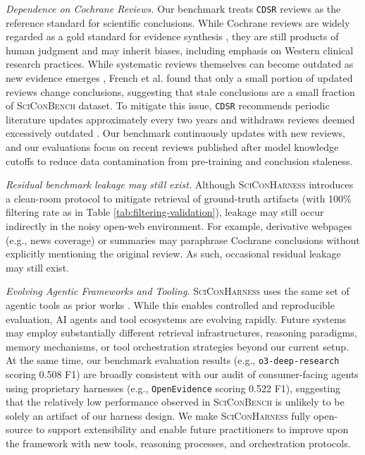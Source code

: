 \documentclass{article}
\begin{document}
\textit{Dependence on Cochrane Reviews.} Our benchmark treats \texttt{CDSR} reviews as the reference standard for scientific conclusions. While Cochrane reviews are widely regarded as a gold standard for evidence synthesis \cite{smith2013cochrane}, they are still products of human judgment and may inherit biases, including emphasis on Western clinical research practices. While systematic reviews themselves can become outdated as new evidence emerges \cite{doi:10.7326/0003-4819-147-4-200708210-00179}, French et al. \cite{french2005investing} found that only a small portion of updated reviews change conclusions, suggesting that stale conclusions are a small fraction of \textsc{SciConBench} dataset. To mitigate this issue, \texttt{CDSR} recommends periodic literature updates approximately every two years and withdraws reviews deemed excessively outdated \cite{CochraneHandbook2024ChapterIV}. Our benchmark continuously updates with new reviews, and our evaluations focus on recent reviews published after model knowledge cutoffs to reduce data contamination from pre-training and conclusion staleness.

\textit{Residual benchmark leakage may still exist.} Although \textsc{SciConHarness} introduces a clean-room protocol to mitigate retrieval of ground-truth artifacts (with 100\% filtering rate as in Table \ref{tab:filtering-validation}), leakage may still occur indirectly in the noisy open-web environment. For example, derivative webpages (e.g., news coverage) or summaries may paraphrase Cochrane conclusions without explicitly mentioning the original review. As such, occasional residual leakage may still exist. 

\textit{Evolving Agentic Frameworks and Tooling.} \textsc{SciConHarness} uses the same set of agentic tools as prior works \cite{shao2025drtulureinforcementlearning}. While this enables controlled and reproducible evaluation, AI agents and tool ecosystems are evolving rapidly. Future systems may employ substantially different retrieval infrastructures, reasoning paradigms, memory mechanisms, or tool orchestration strategies beyond our current setup. At the same time, our benchmark evaluation results (e.g., \texttt{o3-deep-research} scoring 0.508 F1) are broadly consistent with our audit of consumer-facing agents using proprietary harnesses (e.g., \texttt{OpenEvidence} scoring 0.522 F1), suggesting that the relatively low performance observed in \textsc{SciConBench} is unlikely to be solely an artifact of our harness design. We make \textsc{SciConHarness} fully open-source to support extensibility and enable future practitioners to improve upon the framework with new tools, reasoning processes, and orchestration protocols.
\end{document}
